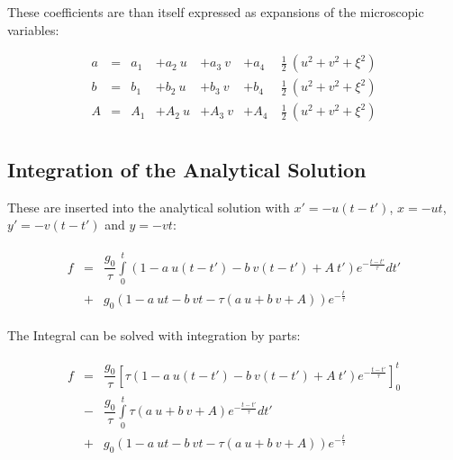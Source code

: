 \documentclass[
	pdftex,             %
	12pt,				%
	a4paper,		   	%
	english,				%
	oneside,			%
]{article}
\begin{document}
These coefficients are than itself expressed as expansions of the microscopic variables:

\begin{equation}
\begin{array}{lclllll}
a &=& a_1 &+ a_2~u &+ a_3~v &+ a_4~&\frac{1}{2}~(u^2 + v^2 + \xi^2) \\
b &=& b_1 &+ b_2~u &+ b_3~v &+ b_4~&\frac{1}{2}~(u^2 + v^2 + \xi^2) \\
A &=& A_1 &+ A_2~u &+ A_3~v &+ A_4~&\frac{1}{2}~(u^2 + v^2 + \xi^2) \\
\end{array}
\end{equation}

\clearpage

\subsection*{Integration of the Analytical Solution}

These are inserted into the analytical solution with $x' = -u(t-t')$, $x = -ut$, $y' = -v(t-t')$ and $y = -vt$:

\begin{equation}
\begin{split}
\begin{array}{lcll}
f
&=&
\dfrac{g_0}{\tau} \int \limits_0^t
\left( 1 - a~u(t-t') - b~v(t-t') + A~t' \right) e^{-\tfrac{t-t'}{\tau}} dt'
\\
&+&
g_0 \left( 1 - a~ut - b~vt - \tau \left( a~u + b~v + A \right) \right) e^{-\tfrac{t}{\tau}}
\end{array}
\end{split}
\end{equation}

The Integral can be solved with integration by parts:

\begin{equation}
\begin{split}
\begin{array}{lcll}
f
&=&
\dfrac{g_0}{\tau} 
\left[
\tau
\left( 1 - a~u(t-t') - b~v(t-t') + A~t' \right)
e^{-\tfrac{t-t'}{\tau}}
\right]_0^t
\\
&-&
\dfrac{g_0}{\tau} \int \limits_0^t
\tau
\left( a~u + b~v + A\right) e^{-\tfrac{t-t'}{\tau}} dt'
\\
&+&
g_0 \left( 1 - a~ut - b~vt - \tau \left( a~u + b~v + A \right) \right) e^{-\tfrac{t}{\tau}}
\end{array}
\end{split}
\end{equation}
\end{document}
